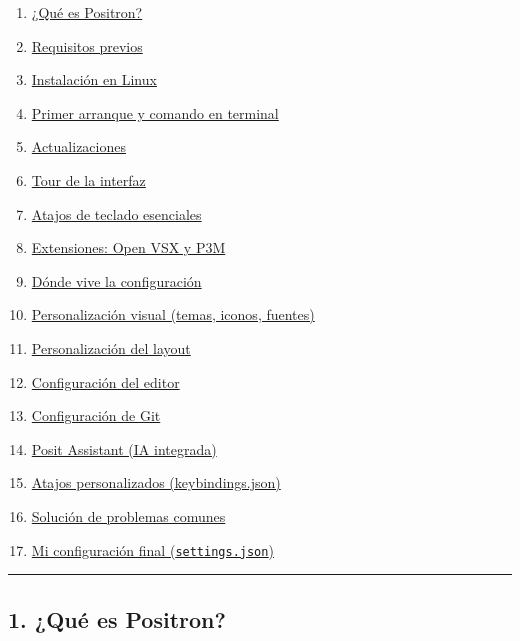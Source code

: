 \documentclass[
  doc,
  floatsintext,
  longtable,
  a4paper,
  nolmodern,
  notxfonts,
  notimes,
  12pt,
  colorlinks=true,linkcolor=blue,citecolor=blue,urlcolor=blue]{apa7}
\providecommand{\tightlist}{%
  \setlength{\itemsep}{0pt}\setlength{\parskip}{0pt}}
\begin{document}
\begin{enumerate}
\def\labelenumi{\arabic{enumi}.}
\tightlist
\item
  \hyperref[1-quuxe9-es-positron]{¿Qué es Positron?}
\item
  \hyperref[2-requisitos-previos]{Requisitos previos}
\item
  \hyperref[3-instalaciuxf3n-en-linux]{Instalación en Linux}
\item
  \hyperref[4-primer-arranque-y-comando-en-terminal]{Primer arranque y
  comando en terminal}
\item
  \hyperref[5-actualizaciones]{Actualizaciones}
\item
  \hyperref[6-tour-de-la-interfaz]{Tour de la interfaz}
\item
  \hyperref[7-atajos-de-teclado-esenciales]{Atajos de teclado
  esenciales}
\item
  \hyperref[8-extensiones-open-vsx-y-p3m]{Extensiones: Open VSX y P3M}
\item
  \hyperref[9-duxf3nde-vive-la-configuraciuxf3n]{Dónde vive la
  configuración}
\item
  \hyperref[10-personalizaciuxf3n-visual-temas-iconos-fuentes]{Personalización
  visual (temas, iconos, fuentes)}
\item
  \hyperref[11-personalizaciuxf3n-del-layout]{Personalización del
  layout}
\item
  \hyperref[12-configuraciuxf3n-del-editor]{Configuración del editor}
\item
  \hyperref[13-configuraciuxf3n-de-git]{Configuración de Git}
\item
  \hyperref[14-posit-assistant-ia-integrada]{Posit Assistant (IA
  integrada)}
\item
  \hyperref[15-atajos-personalizados-keybindingsjson]{Atajos
  personalizados (keybindings.json)}
\item
  \hyperref[16-soluciuxf3n-de-problemas-comunes]{Solución de problemas
  comunes}
\item
  \hyperref[17-mi-configuraciuxf3n-final-settingsjson]{Mi configuración
  final (\texttt{settings.json})}
\end{enumerate}

\begin{center}\rule{0.5\linewidth}{0.5pt}\end{center}

\subsection{1. ¿Qué es Positron?}\label{quuxe9-es-positron}
\end{document}
